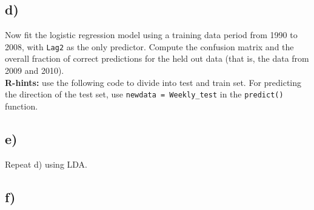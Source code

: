 \documentclass[
]{article}
\newenvironment{Shaded}{\begin{snugshade}}{\end{snugshade}}
\newcommand{\AttributeTok}[1]{\textcolor[rgb]{0.13,0.29,0.53}{#1}}
\newcommand{\DecValTok}[1]{\textcolor[rgb]{0.00,0.00,0.81}{#1}}
\newcommand{\FloatTok}[1]{\textcolor[rgb]{0.00,0.00,0.81}{#1}}
\newcommand{\FunctionTok}[1]{\textcolor[rgb]{0.13,0.29,0.53}{\textbf{#1}}}
\newcommand{\NormalTok}[1]{#1}
\newcommand{\OtherTok}[1]{\textcolor[rgb]{0.56,0.35,0.01}{#1}}
\newcommand{\SpecialCharTok}[1]{\textcolor[rgb]{0.81,0.36,0.00}{\textbf{#1}}}
\newcommand{\StringTok}[1]{\textcolor[rgb]{0.31,0.60,0.02}{#1}}
\begin{document}
\begin{Shaded}
\end{Shaded}

\hypertarget{d-1}{%
\subsection{d)}\label{d-1}}

Now fit the logistic regression model using a training data period from
1990 to 2008, with \texttt{Lag2} as the only predictor. Compute the
confusion matrix and the overall fraction of correct predictions for the
held out data (that is, the data from 2009 and 2010).\\
\textbf{R-hints:} use the following code to divide into test and train
set. For predicting the direction of the test set, use
\texttt{newdata\ =\ Weekly\_test} in the \texttt{predict()} function.

\begin{Shaded}
\end{Shaded}

\hypertarget{e}{%
\subsection{e)}\label{e}}

Repeat d) using LDA.

\hypertarget{f}{%
\subsection{f)}\label{f}}
\end{document}
